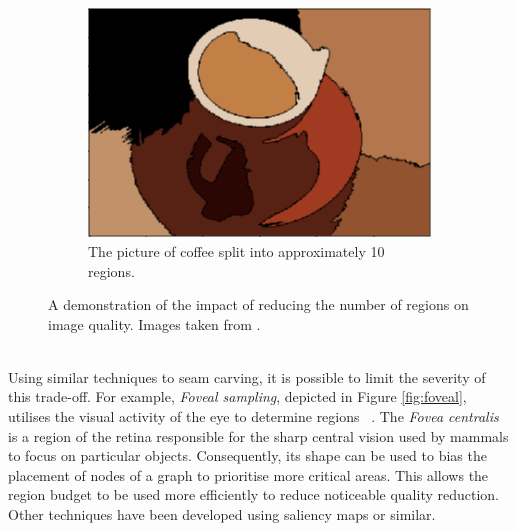 \begin{figure}[h!]
\begin{subfigure}[t]{0.29\textwidth}
        \includegraphics[scale=0.25]{figures/adjacencyAfter}
        \caption{The picture of coffee split into approximately 10 regions.}
    \end{subfigure}%
    \caption[Tuning Region Adjacency Graphs]{A demonstration of the impact of reducing the number of regions on image quality. Images taken from \cite{Foveal}.}
    \label{fig:regions}
\end{figure}
\smallskip \\ \indent
Using similar techniques to seam carving, it is possible to limit the severity of this trade-off. For example, \textit{Foveal sampling}, depicted in Figure \ref{fig:foveal}, utilises the visual activity of the eye to determine regions ~\cite{Foveal}. The \textit{Fovea centralis} is a region of the retina responsible for the sharp central vision used by mammals to focus on particular objects. Consequently, its shape can be used to bias the placement of nodes of a graph to prioritise more critical areas. This allows the region budget to be used more efficiently to reduce noticeable quality reduction. Other techniques have been developed using saliency maps or similar.

